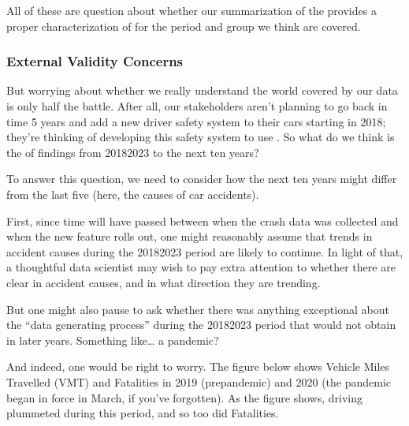 \documentclass[letterpaper,10pt,english]{jupyterBook}
\begin{document}
\sphinxAtStartPar
All of these are question about whether our summarization of the  provides a proper characterization of  for the period and group we think are covered.


\subsubsection{External Validity Concerns}
\label{\detokenize{30_questions/17_exploratory_questions_internal_external:external-validity-concerns}}
\sphinxAtStartPar
But worrying about whether we really understand the world covered by our data is only half the battle. After all, our stakeholders aren’t planning to go back in time 5 years and add a new driver safety system to their cars starting in 2018; they’re thinking of developing this safety system to use . So what do we think is the  of findings from 2018\sphinxhyphen{}2023 to the next ten years?

\sphinxAtStartPar
To answer this question, we need to consider how the next ten years might differ from the last five  (here, the causes of car accidents).

\sphinxAtStartPar
First, since time will have passed between when the crash data was collected and when the new feature rolls out, one might reasonably assume that trends in accident causes during the 2018\sphinxhyphen{}2023 period are likely to continue. In light of that, a thoughtful data scientist may wish to pay extra attention to whether there are clear  in accident causes, and in what direction they are trending.

\sphinxAtStartPar
But one might also pause to ask whether there was anything exceptional about the “data generating process” during the 2018\sphinxhyphen{}2023 period that would not obtain in later years. Something like… a pandemic?

\sphinxAtStartPar
And indeed, one would be right to worry. The figure below shows Vehicle Miles Travelled (VMT) and Fatalities in 2019 (pre\sphinxhyphen{}pandemic) and 2020 (the pandemic began in force in March, if you’ve forgotten). As the figure shows, driving plummeted during this period, and so too did Fatalities.

\sphinxAtStartPar
{}
\end{document}
